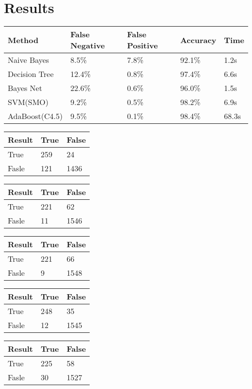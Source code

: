 \section{Results}
\begin{tabular}{|l|l l l l|}
\hline
Method & False Negative & False Positive & Accuracy & Time \\
\hline
Naive Bayes & 8.5\% & 7.8\% & 92.1\% & 1.2s \\
Decision Tree & 12.4\% & 0.8\% & 97.4\% & 6.6s \\
Bayes Net & 22.6\% & 0.6\% & 96.0\% & 1.5s \\
SVM(SMO) & 9.2\% & 0.5\% & 98.2\% & 6.9s \\
AdaBoost(C4.5) & 9.5\% & 0.1\% & 98.4\% & 68.3s \\
\hline
\end{tabular}
\begin{tabular}{|l|l l|}
\hline
Result & True & False \\
\hline
True & 259 & 24 \\
Fasle & 121 & 1436 \\
\hline
\end{tabular}
\begin{tabular}{|l|l l|}
\hline
Result & True & False \\
\hline
True & 221 & 62 \\
Fasle & 11 & 1546 \\
\hline
\end{tabular}
\begin{tabular}{|l|l l|}
\hline
Result & True & False \\
\hline
True & 221 & 66 \\
Fasle & 9 & 1548 \\
\hline
\end{tabular}
\begin{tabular}{|l|l l|}
\hline
Result & True & False \\
\hline
True & 248 & 35 \\
Fasle & 12 & 1545 \\
\hline
\end{tabular}
\begin{tabular}{|l|l l|}
\hline
Result & True & False \\
\hline
True & 225 & 58 \\
Fasle & 30 & 1527 \\
\hline
\end{tabular}

